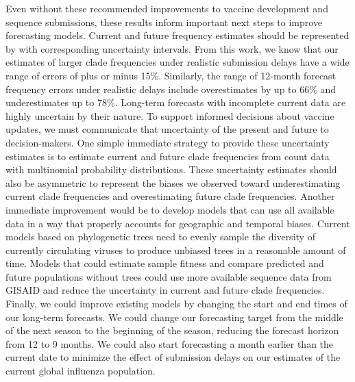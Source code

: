 \documentclass[9pt,lineno]{elife}
\begin{document}
Even without these recommended improvements to vaccine development and sequence submissions, these results inform important next steps to improve forecasting models.
Current and future frequency estimates should be represented by with corresponding uncertainty intervals.
From this work, we know that our estimates of larger clade frequencies under realistic submission delays have a wide range of errors of plus or minus 15\%.
Similarly, the range of 12-month forecast frequency errors under realistic delays include overestimates by up to 66\% and underestimates up to 78\%.
Long-term forecasts with incomplete current data are highly uncertain by their nature.
To support informed decisions about vaccine updates, we must communicate that uncertainty of the present and future to decision-makers.
One simple immediate strategy to provide these uncertainty estimates is to estimate current and future clade frequencies from count data with multinomial probability distributions.
These uncertainty estimates should also be asymmetric to represent the biases we observed toward underestimating current clade frequencies and overestimating future clade frequencies.
Another immediate improvement would be to develop models that can use all available data in a way that properly accounts for geographic and temporal biases.
Current models based on phylogenetic trees need to evenly sample the diversity of currently circulating viruses to produce unbiased trees in a reasonable amount of time.
Models that could estimate sample fitness and compare predicted and future populations without trees could use more available sequence data from GISAID and reduce the uncertainty in current and future clade frequencies.
Finally, we could improve existing models by changing the start and end times of our long-term forecasts.
We could change our forecasting target from the middle of the next season to the beginning of the season, reducing the forecast horizon from 12 to 9 months.
We could also start forecasting a month earlier than the current date to minimize the effect of submission delays on our estimates of the current global influenza population.
\end{document}
